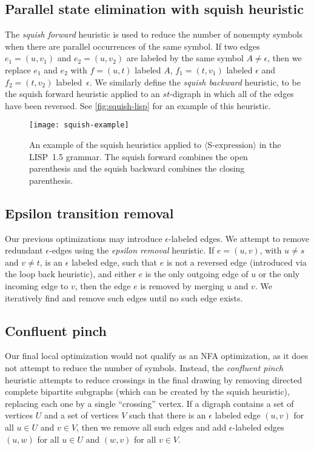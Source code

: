 \documentclass[10pt]{llncs}
\newcommand{\nonterm}[1]{\langle\text{#1}\rangle}
\begin{document}
\subsection{Parallel state elimination with squish heuristic}
The \emph{squish forward} heuristic is used to reduce the number of nonempty symbols when there are parallel occurrences of the same symbol. If two edges $e_1=(u,v_1)$ and $e_2=(u,v_2)$ are labeled by the same symbol $A \neq \epsilon$, then we replace $e_1$ and $e_2$ with $f = (u,t)$ labeled $A$, $f_1 = (t,v_1)$ labeled $\epsilon$ and $f_2 = (t,v_2)$ labeled~$\epsilon$. We similarly define the \emph{squish backward} heuristic, to be the squish forward heuristic applied to an $st$-digraph in which all of the edges have been reversed. See \autoref{fig:squish-lisp} for an example of this heuristic.

\begin{figure}
\centering
\texttt{[image: squish-example]}
\caption{An example of the squish heuristics applied to $\nonterm{S-expression}$ in the LISP~1.5 grammar. The squish forward combines the open parenthesis and the squish backward combines the closing parenthesis.}
\label{fig:squish-lisp}
\end{figure}

\subsection{Epsilon transition removal}
Our previous optimizations may introduce $\epsilon$-labeled edges. We attempt to remove redundant $\epsilon$-edges using the \emph{epsilon removal} heuristic. If $e = (u,v)$, with $u\neq s$ and $v \neq t$, is an $\epsilon$ labeled edge, such that $e$ is not a reversed edge (introduced via the loop back heuristic), and either $e$ is the only outgoing edge of $u$ or the only incoming edge to $v$, then the edge $e$ is removed by merging $u$ and $v$. We iteratively find and remove such edges until no such edge exists.

\subsection{Confluent pinch}
Our final local optimization would not qualify as an NFA optimization, as it does not attempt to reduce the number of symbols. Instead, the \emph{confluent pinch} heuristic attempts to reduce crossings in the final drawing by removing directed complete bipartite subgraphs (which can be created by the squish heuristic), replacing each one by a single ``crossing'' vertex. If a digraph contains a set of vertices $U$ and a set of vertices $V$ such that there is an $\epsilon$ labeled edge $(u, v)$ for all $u \in U$ and $v \in V$, then we remove all such edges and add $\epsilon$-labeled edges $(u,w)$ for all $u \in U$ and $(w, v)$ for all $v \in V$.
\end{document}

